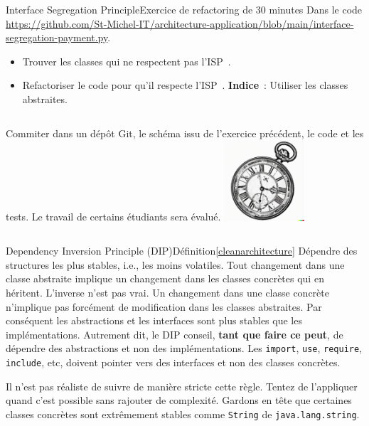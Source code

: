 \documentclass{beamer}
\begin{document}
    \begin{frame}{Interface Segregation Principle}{Exercice \execcounterdispinc{} de refactoring de 30 minutes}
        Dans le code \url{https://github.com/St-Michel-IT/architecture-application/blob/main/interface-segregation-payment.py}.
        \begin{itemize}
            \item Trouver les classes qui ne respectent pas l'ISP~.
            \item Refactoriser le code pour qu'il respecte l'ISP~. \textbf{Indice}~: Utiliser les classes abstraites.
        \end{itemize}
        \bigbreak
        \begin{columns}
            Commiter dans un dépôt Git, le schéma issu de l'exercice précédent, le code et les tests.
            \bigbreak
            Le travail de certains étudiants sera évalué.
            \centering
            \includegraphics[width=3cm]{image/engraving-of-an-old-watch}
        \end{columns}
    \end{frame}

    \begin{frame}{Dependency Inversion Principle (DIP)}{Définition\cref{cleanarchitecture}}
        Dépendre des structures les plus stables, i.e., les moins volatiles.
        \bigbreak
        Tout changement dans une classe abstraite implique un changement dans les classes concrètes qui en héritent.
        L'inverse n'est pas vrai.
        Un changement dans une classe concrète n'implique pas forcément de modification dans les classes abstraites.
        \bigbreak
        Par conséquent les abstractions et les interfaces sont plus stables que les implémentations.
        \bigbreak
        Autrement dit, le DIP conseil, \textbf{tant que faire ce peut}, de dépendre des abstractions et non des implémentations.
        Les \lstinline{import}, \lstinline{use}, \lstinline{require}, \lstinline{include}, etc, doivent pointer vers des interfaces et non des classes concrètes.
        \begin{footnotesize}
            \begin{dangercolorbox}
                Il n'est pas réaliste de suivre de manière stricte cette règle.
                Tentez de l'appliquer quand c'est possible sans rajouter de complexité.
                Gardons en tête que certaines classes concrètes sont extrêmement stables comme \lstinline{String} de \lstinline{java.lang.string}.
            \end{dangercolorbox}
        \end{footnotesize}
    \end{frame}
\end{document}
